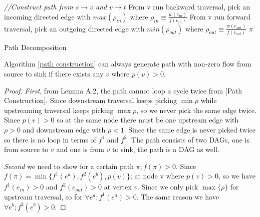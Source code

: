 \begin{algorithm}[ht]
  \SetAlgoLined\DontPrintSemicolon
 \label{path construction}
   \label{flow placement}
  \myalg{\path{}}  {
\emph{//Construct path from $s\rightarrow v$ and $v\rightarrow t$}\;
From v run backward traversal, pick an incoming directed edge with $ max( \rho_{in} )  $ where $\rho_{in} \equiv \frac{ w(e_{in})}{f(e_{in})}$\;
From v run forward traversal, pick an outgoing directed edge with $ min(\rho_{out} ) $ where $\rho_{out} \equiv \frac{ w(e_{out})}{f(e_{out})} $\;
 \KwRet $\pi$\;}{}
  \setcounter{AlgoLine}{0}
\caption{Path Decomposition}
\end{algorithm}


\begin{lemma}   Algorithm \ref{path construction} can always generate path with non-zero flow from source to sink if there exists any $v$ where $p(v) >0$. \end{lemma}
\begin{proof}
\textit{First}, from Lemma A.2, the path cannot loop a cycle twice from [Path Construction]. Since downstream traversal keeps picking $\min \rho$ while upstreaming traversal keeps picking $\max \rho$, so we never pick the same edge twice. Since $p(v)>0$ so at the same node there must be one upstream edge with $\rho>0$ and downstream edge with $\rho<1$. Since the same edge is never picked twice so there is no loop in terms of $f^1$ and $f^2$. The path consists of two DAGs, one is from source to $v$ and one is from $v$ to sink, the path is a DAG as well.

\textit{Second} we need to show for a certain path $\pi; f(\pi)>0$. Since $ f(\pi) =  \min\{f^1(e^a), f^2(e^b), p(v)\}$; at node v where $p(v)>0$, so we have $f^1(e_{in})>0$ and $f^2(e_{out})>0$ at vertex $v$. Since we only pick $\max\{\rho\}$ for upstream traversal, so for $\forall e^a; f^1(e^a)>0$. The same reason we have $\forall e^b; f^2(e^b)>0$.

\end{proof}


